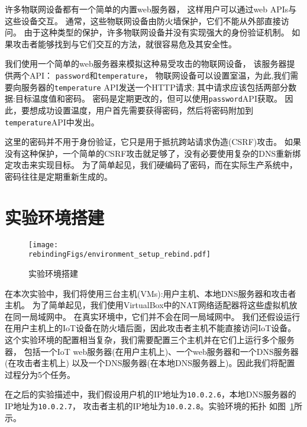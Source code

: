 许多物联网设备都有一个简单的内置web服务器，
这样用户可以通过web APIs与这些设备交互。
通常，这些物联网设备由防火墙保护，它们不能从外部直接访问。
由于这种类型的保护，许多物联网设备并没有实现强大的身份验证机制。
如果攻击者能够找到与它们交互的方法，就很容易危及其安全性。


我们使用一个简单的web服务器来模拟这种易受攻击的物联网设备，
该服务器提供两个API： \texttt{password}和\texttt{temperature}，
物联网设备可以设置室温，为此,我们需要向服务器的\texttt{temperature} API发送一个HTTP请求;
其中请求应该包括两部分数据:目标温度值和密码。
密码是定期更改的，但可以使用\texttt{password}API获取。
因此，要想成功设置温度，用户首先需要获得密码，然后将密码附加到\texttt{temperature}API中发出。


这里的密码并不用于身份验证，它只是用于抵抗跨站请求伪造(CSRF)攻击。
如果没有这种保护，一个简单的CSRF攻击就足够了，没有必要使用复杂的DNS重新绑定攻击来实现目标。
为了简单起见，我们硬编码了密码，而在实际生产系统中，密码往往是定期重新生成的。



\section{实验环境搭建}

\begin{figure}[htb]
\centering
\texttt{[image: \\rebindingFigs/environment\_setup\_rebind.pdf]}
\caption{实验环境搭建}
\label{dns:fig:rebind_environment}
\end{figure}


在本次实验中，我们将使用三台主机(VMs):用户主机、本地DNS服务器和攻击者主机。
为了简单起见，我们使用VirtualBox中的NAT网络适配器将这些虚拟机放在同一局域网中。
在真实环境中，它们并不会在同一局域网中。
我们还假设运行在用户主机上的IoT设备在防火墙后面，因此攻击者主机不能直接访问IoT设备。
这个实验环境的配置相当复杂，我们需要配置三个主机并在它们上运行多个服务器，
包括一个IoT web服务器(在用户主机上)、一个web服务器和一个DNS服务器(在攻击者主机上)
以及一个DNS服务器(在本地DNS服务器上)。因此我们将配置过程分为5个任务。


在之后的实验描述中，我们假设用户机的IP地址为{\tt 10.0.2.6}，本地DNS服务器的IP地址为{\tt 10.0.2.7}，
攻击者主机的IP地址为{\tt 10.0.2.8}。实验环境的拓扑
如图~\ref{dns:fig:rebind_environment}所示。



